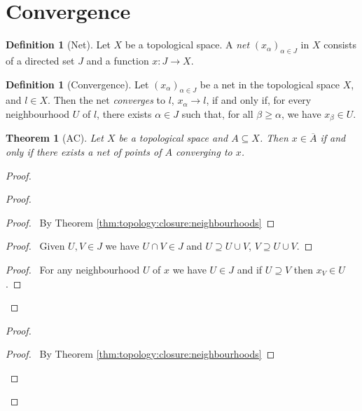 \documentclass{report}
\let\qed\relax
\newtheorem{thm}[lm]{Theorem}
\theoremstyle{definition}
\newtheorem{df}[lm]{Definition}
\begin{document}
  \section{Convergence}

      \begin{df}[Net]
    Let $X$ be a topological space. A \emph{net} $(x_\alpha)_{\alpha \in J}$ in
$X$ consists of a directed set $J$ and a function $x : J \rightarrow X$.
  \end{df}

    \begin{df}[Convergence]
    Let $(x_\alpha)_{\alpha \in J}$ be a net in the topological space $X$, and
    $l \in X$. Then the net \emph{converges} to $l$, $x_\alpha \rightarrow l$,
if and only if, for every neighbourhood $U$ of $l$, there exists $\alpha \in J$
such that, for all $\beta \geq \alpha$, we have $x_\beta \in U$.
  \end{df}

    \begin{thm}[AC]
      \label{thm:topology:convergence:closure}
    Let $X$ be a topological space and $A \subseteq X$. Then $x \in
\overline{A}$ if and only if there exists a net of points of $A$ converging to
$x$.
  \end{thm}

  \begin{proof}
   \pf
   \begin{proof}
     \begin{proof}
       \pf\ By Theorem \ref{thm:topology:closure:neighbourhoods}
     \end{proof}
     \begin{proof}
       \pf\ Given $U, V \in J$ we have $U \cap V \in J$ and $U \supseteq U \cup
V$, $V \supseteq U \cup V$.
     \end{proof}
     \begin{proof}
       \pf\ For any neighbourhood $U$ of $x$ we have $U \in J$ and if $U
\supseteq V$ then $x_V \in U$.
     \end{proof}
   \end{proof}
   \begin{proof}
     \qedstep
     \begin{proof}
       \pf\ By Theorem \ref{thm:topology:closure:neighbourhoods}
     \end{proof}
   \end{proof}
   \qed
  \end{proof}
\end{document}

